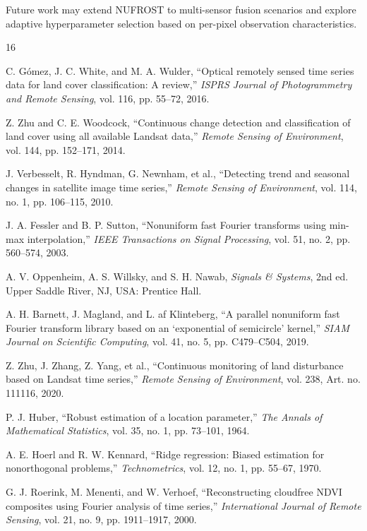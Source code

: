 \documentclass[letterpaper,journal]{IEEEtran}
\begin{document}
Future work may extend NUFROST to multi-sensor fusion scenarios and explore adaptive hyperparameter selection based on per-pixel observation characteristics.

\begin{thebibliography}{16}

C. G\'{o}mez, J. C. White, and M. A. Wulder, ``Optical remotely sensed time series data for land cover classification: A review,'' \textit{ISPRS Journal of Photogrammetry and Remote Sensing}, vol. 116, pp. 55--72, 2016.

Z. Zhu and C. E. Woodcock, ``Continuous change detection and classification of land cover using all available Landsat data,'' \textit{Remote Sensing of Environment}, vol. 144, pp. 152--171, 2014.

J. Verbesselt, R. Hyndman, G. Newnham, et al., ``Detecting trend and seasonal changes in satellite image time series,'' \textit{Remote Sensing of Environment}, vol. 114, no. 1, pp. 106--115, 2010.

J. A. Fessler and B. P. Sutton, ``Nonuniform fast Fourier transforms using min-max interpolation,'' \textit{IEEE Transactions on Signal Processing}, vol. 51, no. 2, pp. 560--574, 2003.

A. V. Oppenheim, A. S. Willsky, and S. H. Nawab, \textit{Signals \& Systems}, 2nd ed. Upper Saddle River, NJ, USA: Prentice Hall.

A. H. Barnett, J. Magland, and L. af Klinteberg, ``A parallel nonuniform fast Fourier transform library based on an `exponential of semicircle' kernel,'' \textit{SIAM Journal on Scientific Computing}, vol. 41, no. 5, pp. C479--C504, 2019.

Z. Zhu, J. Zhang, Z. Yang, et al., ``Continuous monitoring of land disturbance based on Landsat time series,'' \textit{Remote Sensing of Environment}, vol. 238, Art. no. 111116, 2020.

P. J. Huber, ``Robust estimation of a location parameter,'' \textit{The Annals of Mathematical Statistics}, vol. 35, no. 1, pp. 73--101, 1964.

A. E. Hoerl and R. W. Kennard, ``Ridge regression: Biased estimation for nonorthogonal problems,'' \textit{Technometrics}, vol. 12, no. 1, pp. 55--67, 1970.

G. J. Roerink, M. Menenti, and W. Verhoef, ``Reconstructing cloudfree NDVI composites using Fourier analysis of time series,'' \textit{International Journal of Remote Sensing}, vol. 21, no. 9, pp. 1911--1917, 2000.


\end{thebibliography}
\end{document}
